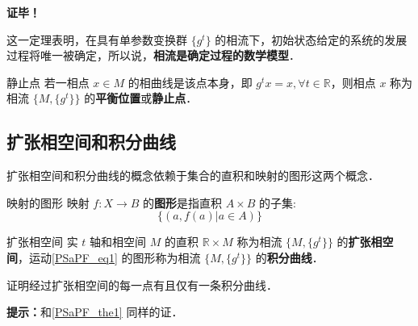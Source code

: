 \textbf{证毕！}

这一定理表明，在具有单参数变换群 $\{g^t\}$ 的相流下，初始状态给定的系统的发展过程将唯一被确定，所以说，\textbf{相流是确定过程的数学模型}．
\begin{definition}{静止点}
若一相点 $x\in M$ 的相曲线是该点本身，即 $g^t x=x,\forall t\in\mathbb R$，则相点 $x$ 称为相流 $\{M,\{g^t\}\}$ 的\textbf{平衡位置}或\textbf{静止点}．
\end{definition}
\subsection{扩张相空间和积分曲线}
扩张相空间和积分曲线的概念依赖于集合的直积和映射的图形这两个概念．
\begin{definition}{映射的图形}
映射 $f:X\rightarrow B$ 的\textbf{图形}是指直积 $A\times B$ 的子集:
\begin{equation}
\{(a,f(a)|a\in A)\}
\end{equation}
\end{definition}
\begin{definition}{扩张相空间}
实 $t$ 轴和相空间 $M$ 的直积 $\mathbb R\times M$ 称为相流 $\{M,\{g^t\}\}$ 的\textbf{扩张相空间}，运动\autoref{PSaPF_eq1} 的图形称为相流 $\{M,\{g^t\}\}$ 的\textbf{积分曲线}．
\end{definition}
\begin{exercise}{}
证明经过扩张相空间的每一点有且仅有一条积分曲线．
\end{exercise}
\textbf{提示：}和\autoref{PSaPF_the1} 同样的证．

